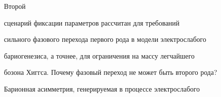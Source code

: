 

































Второй 


сценарий фиксации параметров рассчитан для требований

сильного фазового перехода первого рода в модели электрослабого

бариогенезиса, а точнее, для ограничения на массу легчайшего

бозона Хиггса. Почему фазовый переход не может быть второго рода?

Барионная асимметрия, генерируемая в процессе электрослабого

